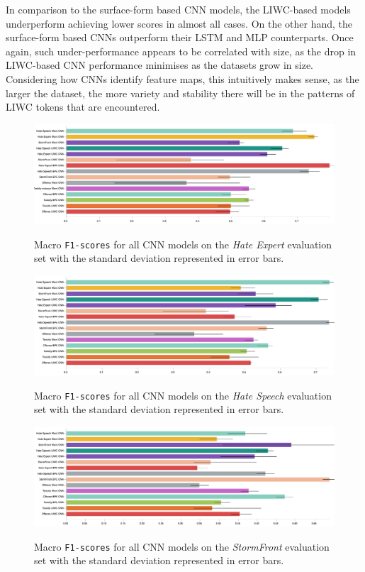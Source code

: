In comparison to the surface-form based CNN models, the LIWC-based models underperform achieving lower scores in almost all cases. On the other hand, the surface-form based CNNs outperform their LSTM and MLP counterparts. Once again, such under-performance appears to be correlated with size, as the drop in LIWC-based CNN performance minimises as the datasets grow in size.
Considering how CNNs identify feature maps, this intuitively makes sense, as the larger the dataset, the more variety and stability there will be in the patterns of LIWC tokens that are encountered.

\begin{figure}
\begin{minipage}{\textwidth}
\centering
    \includegraphics[width=\textwidth]{all_cnn_waseem_test.pdf}
    \caption{Macro \texttt{F1-scores} for all CNN models on the \textit{Hate Expert} evaluation set with the standard deviation represented in error bars.}
    \label{fig:waseem_cnn_test}
    \vfill
    \includegraphics[width=\textwidth]{all_cnn_waseem_hovy_test.pdf}
    \caption{Macro \texttt{F1-scores} for all CNN models on the \textit{Hate Speech} evaluation set with the standard deviation represented in error bars.}
  \label{fig:waseem_hovy_cnn_test}
    \includegraphics[width=\textwidth]{all_cnn_garcia_test.pdf}
  \caption{Macro \texttt{F1-scores} for all CNN models on the \textit{StormFront} evaluation set with the standard deviation represented in error bars.}
  \label{fig:garcia_cnn_test}
\end{minipage}
\end{figure}

